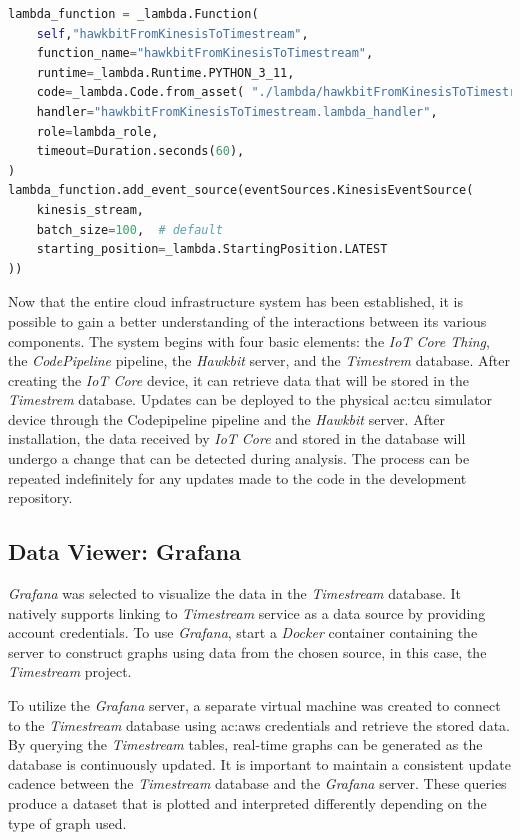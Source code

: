 \begin{lstlisting}[language=Python, caption={\textit{CDK} code for the creation of \textit{Lambda} function that takes data from \textit{Kinesis} stream and sends it to the \textit{Timestream} tables}, label=lst:AWSTimestreamlambda]
lambda_function = _lambda.Function(
    self,"hawkbitFromKinesisToTimestream",
    function_name="hawkbitFromKinesisToTimestream",
    runtime=_lambda.Runtime.PYTHON_3_11,
    code=_lambda.Code.from_asset( "./lambda/hawkbitFromKinesisToTimestream.zip"),
    handler="hawkbitFromKinesisToTimestream.lambda_handler",
    role=lambda_role,
    timeout=Duration.seconds(60),
)
lambda_function.add_event_source(eventSources.KinesisEventSource(
    kinesis_stream,
    batch_size=100,  # default
    starting_position=_lambda.StartingPosition.LATEST
))
\end{lstlisting}
Now that the entire cloud infrastructure system has been established, it is possible to gain a better understanding of the interactions between its various components. The system begins with four basic elements: the \textit{IoT Core Thing}, the \textit{CodePipeline} pipeline, the \textit{Hawkbit} server, and the \textit{Timestrem} database. After creating the \textit{IoT Core} device, it can retrieve data that will be stored in the \textit{Timestrem} database. Updates can be deployed to the physical \gls{ac:tcu} simulator device through the Codepipeline pipeline and the \textit{Hawkbit} server. After installation, the data received by \textit{IoT Core} and stored in the database will undergo a change that can be detected during analysis. The process can be repeated indefinitely for any updates made to the code in the development repository.

\subsection{Data Viewer: Grafana}
\textit{Grafana} was selected to visualize the data in the \textit{Timestream} database. It natively supports linking to \textit{Timestream} service as a data source by providing account credentials. To use \textit{Grafana}, start a \textit{Docker} container containing the server to construct graphs using data from the chosen source, in this case, the \textit{Timestream} project.

To utilize the \textit{Grafana} server, a separate virtual machine was created to connect to the \textit{Timestream} database using \gls{ac:aws} credentials and retrieve the stored data. By querying the \textit{Timestream} tables, real-time graphs can be generated as the database is continuously updated. It is important to maintain a consistent update cadence between the \textit{Timestream} database and the \textit{Grafana} server. These queries produce a dataset that is plotted and interpreted differently depending on the type of graph used.

